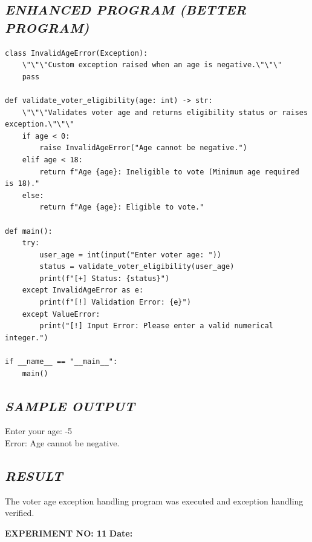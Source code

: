 \documentclass[11pt,a4paper]{article}
\begin{document}
\subsection*{\textit{ENHANCED PROGRAM (BETTER PROGRAM)}}
\begin{lstlisting}[style=pythonstyle]
class InvalidAgeError(Exception):
    \"\"\"Custom exception raised when an age is negative.\"\"\"
    pass

def validate_voter_eligibility(age: int) -> str:
    \"\"\"Validates voter age and returns eligibility status or raises exception.\"\"\"
    if age < 0:
        raise InvalidAgeError("Age cannot be negative.")
    elif age < 18:
        return f"Age {age}: Ineligible to vote (Minimum age required is 18)."
    else:
        return f"Age {age}: Eligible to vote."

def main():
    try:
        user_age = int(input("Enter voter age: "))
        status = validate_voter_eligibility(user_age)
        print(f"[+] Status: {status}")
    except InvalidAgeError as e:
        print(f"[!] Validation Error: {e}")
    except ValueError:
        print("[!] Input Error: Please enter a valid numerical integer.")

if __name__ == "__main__":
    main()
\end{lstlisting}

\subsection*{\textit{SAMPLE OUTPUT}}
\begin{tcolorbox}[colback=black!85,colframe=navyblue,title=\textbf{Terminal Output},coltitle=white,fonttitle=\bfseries\small]
\small\ttfamily\color{green!30!white}
Enter your age: -5\\
Error: Age cannot be negative.
\end{tcolorbox}

\subsection*{\textit{RESULT}}
The voter age exception handling program was executed and exception handling verified.

\newpage

\noindent
\textbf{\large EXPERIMENT NO: 11} \hfill \textbf{\large Date: \underline{\hspace{3cm}}}
\end{document}
